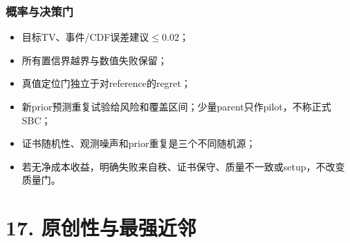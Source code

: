 \documentclass[
  10pt,
  a4paper,
]{article}
\providecommand{\tightlist}{%
  \setlength{\itemsep}{0pt}\setlength{\parskip}{0pt}}
\providecommand{\tightlist}{\setlength{\itemsep}{1pt}\setlength{\parskip}{1pt}}
\begin{document}
\hypertarget{ux6982ux7387ux4e0eux51b3ux7b56ux95e8}{%
\subsubsection{概率与决策门}\label{ux6982ux7387ux4e0eux51b3ux7b56ux95e8}}

\begin{itemize}
\tightlist
\item
  目标TV、事件/CDF误差建议\(\le0.02\)；
\item
  所有置信界越界与数值失败保留；
\item
  真值定位门独立于对reference的regret；
\item
  新prior预测重复试验给风险和覆盖区间；少量parent只作pilot，不称正式SBC；
\item
  证书随机性、观测噪声和prior重复是三个不同随机源；
\item
  若无净成本收益，明确失败来自秩、证书保守、质量不一致或setup，不改变质量门。
\end{itemize}

\hypertarget{ux539fux521bux6027ux4e0eux6700ux5f3aux8fd1ux90bb}{%
\section{17.
原创性与最强近邻}\label{ux539fux521bux6027ux4e0eux6700ux5f3aux8fd1ux90bb}}
\end{document}
